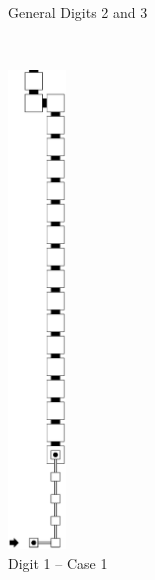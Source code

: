 \begin{itemize}
\begin{figure}[H]
\begin{subfigure}[t]{0.17\textwidth}
                \caption{\label{fig:post_warp_general_digit2and3} General Digits 2 and 3 }
            \end{subfigure}%
            ~
            \begin{subfigure}[t]{0.17\textwidth}
                \centering
                \includegraphics[width=0.17\textwidth]{warping/post_warp_case1_digit1_msr}
                \caption{\label{fig:post_warp_case1_digit1_msr} Digit 1 -- Case 1}
            \end{subfigure}%
            ~
            \begin{subfigure}[t]{0.17\textwidth}
                \centering

\end{subfigure}
\end{figure}
\end{itemize}
